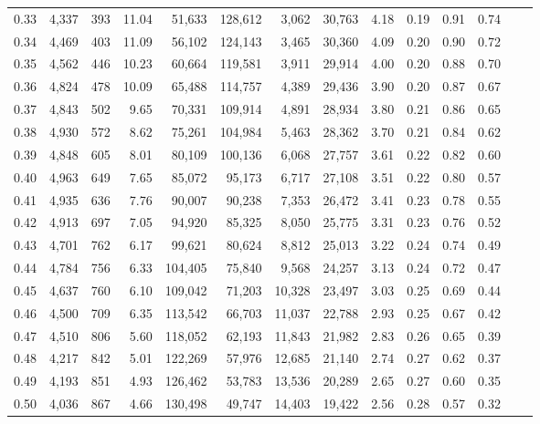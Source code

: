 \begin{tabular}{rrrrrrrrrrrrrr}
0.33 &  4,337 &  393 &   11.04 &   51,633 &  128,612 &   3,062 &  30,763 &  4.18 &  0.19 &  0.91 &      0.74 \\
0.34 &  4,469 &  403 &   11.09 &   56,102 &  124,143 &   3,465 &  30,360 &  4.09 &  0.20 &  0.90 &      0.72 \\
0.35 &  4,562 &  446 &   10.23 &   60,664 &  119,581 &   3,911 &  29,914 &  4.00 &  0.20 &  0.88 &      0.70 \\
0.36 &  4,824 &  478 &   10.09 &   65,488 &  114,757 &   4,389 &  29,436 &  3.90 &  0.20 &  0.87 &      0.67 \\
0.37 &  4,843 &  502 &    9.65 &   70,331 &  109,914 &   4,891 &  28,934 &  3.80 &  0.21 &  0.86 &      0.65 \\
0.38 &  4,930 &  572 &    8.62 &   75,261 &  104,984 &   5,463 &  28,362 &  3.70 &  0.21 &  0.84 &      0.62 \\
0.39 &  4,848 &  605 &    8.01 &   80,109 &  100,136 &   6,068 &  27,757 &  3.61 &  0.22 &  0.82 &      0.60 \\
0.40 &  4,963 &  649 &    7.65 &   85,072 &   95,173 &   6,717 &  27,108 &  3.51 &  0.22 &  0.80 &      0.57 \\
0.41 &  4,935 &  636 &    7.76 &   90,007 &   90,238 &   7,353 &  26,472 &  3.41 &  0.23 &  0.78 &      0.55 \\
0.42 &  4,913 &  697 &    7.05 &   94,920 &   85,325 &   8,050 &  25,775 &  3.31 &  0.23 &  0.76 &      0.52 \\
0.43 &  4,701 &  762 &    6.17 &   99,621 &   80,624 &   8,812 &  25,013 &  3.22 &  0.24 &  0.74 &      0.49 \\
0.44 &  4,784 &  756 &    6.33 &  104,405 &   75,840 &   9,568 &  24,257 &  3.13 &  0.24 &  0.72 &      0.47 \\
0.45 &  4,637 &  760 &    6.10 &  109,042 &   71,203 &  10,328 &  23,497 &  3.03 &  0.25 &  0.69 &      0.44 \\
0.46 &  4,500 &  709 &    6.35 &  113,542 &   66,703 &  11,037 &  22,788 &  2.93 &  0.25 &  0.67 &      0.42 \\
0.47 &  4,510 &  806 &    5.60 &  118,052 &   62,193 &  11,843 &  21,982 &  2.83 &  0.26 &  0.65 &      0.39 \\
0.48 &  4,217 &  842 &    5.01 &  122,269 &   57,976 &  12,685 &  21,140 &  2.74 &  0.27 &  0.62 &      0.37 \\
0.49 &  4,193 &  851 &    4.93 &  126,462 &   53,783 &  13,536 &  20,289 &  2.65 &  0.27 &  0.60 &      0.35 \\
0.50 &  4,036 &  867 &    4.66 &  130,498 &   49,747 &  14,403 &  19,422 &  2.56 &  0.28 &  0.57 &      0.32 \\

\end{tabular}
